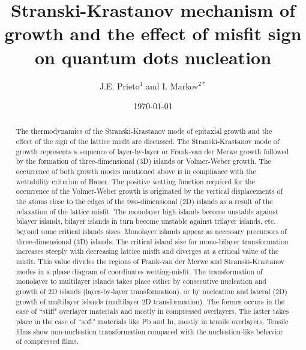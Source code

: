 \documentclass[aps,prl,showpacs,twocolumn,byrevtex,floatfix]{revtex4-1}
\begin{document}
\title{Stranski-Krastanov mechanism of growth and the effect of misfit sign on
quantum dots nucleation}

\author{J.E. Prieto$^{1}$ and I. Markov$^{2*}$}







\date{\today}
\begin{abstract}
The thermodynamics of the Stranski-Krastanov mode of epitaxial growth and the
effect of the sign of the lattice misfit are discussed. The
Stranski-Krastanov mode of growth represents a sequence of layer-by-layer or
Frank-van der Merwe growth followed by the formation of three-dimensional (3D)
islands or Volmer-Weber growth. The occurrence of both growth modes mentioned
above is in compliance with the wettability criterion of Bauer. The positive
wetting function required for the occurrence of the Volmer-Weber growth is
originated by the vertical displacements of the atoms close to the edges of the
two-dimensional (2D) islands as a result of the relaxation of the lattice
misfit. The monolayer high islands become unstable against bilayer islands,
bilayer islands in turn become unstable against trilayer islands, etc. beyond
some critical islands sizes. Monolayer islands appear as necessary precursors of
three-dimensional (3D) islands. The critical island size for mono-bilayer
transformation increases steeply with decreasing lattice misfit and diverges at
a critical value of the misfit. This value divides the regions of Frank-van der
Merwe and Stranski-Krastanov modes in a phase diagram of coordinates
wetting-misfit. The transformation of monolayer to multilayer islands takes
place either by consecutive nucleation and growth of 2D islands (layer-by-layer
transformation), or by nucleation and lateral (2D) growth of multilayer islands
(multilayer 2D transformation). 
The former occurs in the case of ``stiff" overlayer
materials and mostly in compressed overlayers. The latter takes place in the
case of ``soft" materials like Pb and In, mostly in tensile overlayers. Tensile
films show non-nucleation transformation compared with the nucleation-like
behavior of compressed films.




\end{abstract}
\end{document}
